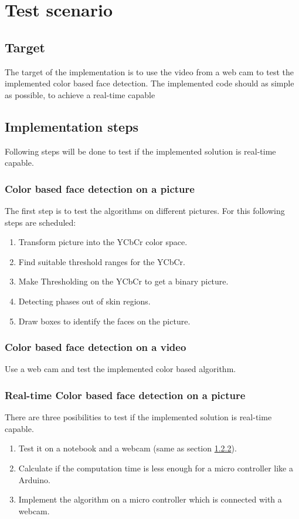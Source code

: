 \documentclass[Bachelorarbeit.tex]{subfiles}
\begin{document}
\chapter{Test scenario}
\section{Target}
The target of the implementation is to use the video from a web cam to test the implemented color based face detection. The implemented code should as simple as possible, to achieve a real-time capable 

\section{Implementation steps}
Following steps will be done to test if the implemented solution is real-time capable.

\subsection{Color based face detection on a picture}
The first step is to test the algorithms on different pictures. For this following steps are scheduled:
\begin{enumerate}
\item Transform picture into the YCbCr color space.
\item Find suitable threshold ranges for the YCbCr.
\item Make Thresholding on the YCbCr to get a binary picture.
\item Detecting phases out of skin regions.
\item Draw boxes to identify the faces on the picture.
\end{enumerate}
\subsection{Color based face detection on a video}\label{CbVidoe}
Use a web cam and test the implemented color based algorithm.
\subsection{Real-time Color based face detection on a picture}
There are three posibilities to test if the implemented solution is real-time capable.
\begin{enumerate}
\item Test it on a notebook and a webcam (same as section \ref{CbVidoe}).
\item Calculate if the computation time is less enough for a micro controller like a Arduino.
\item Implement the algorithm on a micro controller which is connected with a webcam.
\end{enumerate}
\end{document}
